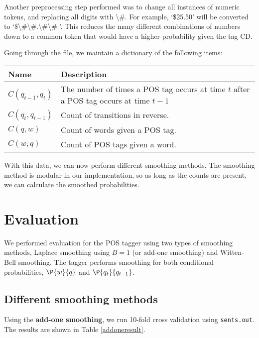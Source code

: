 \documentclass[12pt]{homework}
\begin{document}
Another preprocessing step performed was to change all instances of numeric 
tokens, and replacing all digits with \textbackslash\#. For example, `\$25.50' 
will be converted to 
`\$\textbackslash\#\textbackslash\#.\textbackslash\#\textbackslash\# '. This 
reduces the many different combinations of numbers down to a common token that 
would have a higher probability given the tag CD.

Going through the file, we maintain a dictionary of the following items:
\begin{center}
\begin{tabular}{l l}
	\hline
	Name	&	Description\\
	\hline
	$C(q_{t-1},q_t)$	& The number of times a POS tag occurs at time $t$ 
	after a POS tag occurs at time $t-1$ \\
	$C(q_t,q_{t-1})$	& Count of transitions in reverse. \\
	$C(q,w)$	& Count of words given a POS tag. \\
	$C(w,q)$	& Count of POS tags given a word.\\
	\hline
\end{tabular}
\end{center}
With this data, we can now perform different smoothing methods. The smoothing 
method is modular in our implementation, so as long as the counts are present, 
we can calculate the smoothed probabilities.

\section{Evaluation}
We performed evaluation for the POS tagger using two types of smoothing methods, 
Laplace smoothing using $B=1$ (or add-one smoothing) and Witten-Bell smoothing.  
The tagger performs smoothing for both conditional probabilities, $\P{w}{q}$ and 
$\P{q_t}{q_{t-1}}$.

\subsection{Different smoothing methods}
Using the \textbf{add-one smoothing}, we run 10-fold cross validation using
\texttt{sents.out}. The results are shown in Table \ref{addoneresult}.
\end{document}
